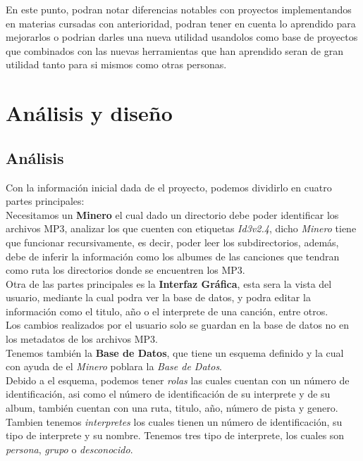 \documentclass[12pt]{report}
\begin{document}
En este punto, podran notar diferencias notables con proyectos implementandos en materias cursadas con anterioridad, podran tener en cuenta lo aprendido para mejorarlos o podrian darles una nueva utilidad usandolos como base de proyectos que combinados con las nuevas herramientas que han aprendido seran de gran utilidad tanto para si mismos como otras personas.\\

\chapter{Análisis y diseño}
\section{Análisis}
Con la información inicial dada de el proyecto, podemos dividirlo en cuatro partes principales:\\

Necesitamos un \textbf{Minero} el cual dado un directorio debe poder identificar los archivos MP3, analizar los que cuenten con etiquetas \textit{Id3v2.4}, dicho \textit{Minero} tiene que funcionar recursivamente, es decir, poder leer los subdirectorios, además, debe de inferir la información como los albumes de las canciones que tendran como ruta los directorios donde se encuentren los MP3.\\

Otra de las partes principales es la \textbf{Interfaz Gráfica}, esta sera la vista del usuario, mediante la cual podra ver la base de datos, y podra editar la información como el titulo, año o el interprete de una canción, entre otros.\\

Los cambios realizados por el usuario solo se guardan en la base de datos no en los metadatos de los archivos MP3.\\

Tenemos también la \textbf{Base de Datos}, que tiene un esquema definido y la cual con ayuda de el \textit{Minero} poblara la \textit{Base de Datos}.\\

Debido a el esquema, podemos tener \textit{rolas} las cuales cuentan con un número de identificación, asi como el número de identificación de su interprete y de su album, también cuentan con una ruta, titulo, año, número de pista y genero.\\

Tambien tenemos \textit{interpretes} los cuales tienen un número de identificación, su tipo de interprete y su nombre. Tenemos tres tipo de interprete, los cuales son \textit{persona}, \textit{grupo} o \textit{desconocido}.\\
\end{document}
